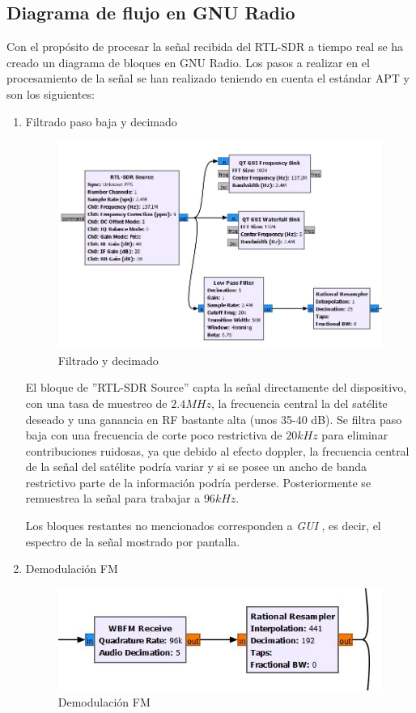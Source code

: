 \documentclass[a4paper,openright,12pt]{article}
\begin{document}
	\subsection{Diagrama de flujo en GNU Radio}
	Con el propósito de procesar la señal recibida del RTL-SDR a tiempo real se ha creado un diagrama de bloques en GNU Radio. Los pasos a realizar en el procesamiento de la señal se han realizado teniendo en cuenta el estándar APT y son los siguientes:
	\begin{enumerate}
	\item Filtrado paso baja y decimado
	
		\begin{figure}[hbtp]
 \centering
 \includegraphics[width = 12cm]{imagenes/primer_paso.JPG}
 \caption{Filtrado y decimado}
 \label{filtardo_decimado}
 \end{figure}
 
 El bloque de ''RTL-SDR Source'' capta la señal directamente del dispositivo, con una tasa de muestreo de $2.4 MHz$, la frecuencia central la del satélite deseado y una ganancia en RF bastante alta (unos 35-40 dB).
 Se filtra paso baja con una frecuencia de corte poco restrictiva de $20 kHz$ para eliminar contribuciones ruidosas, ya que debido al efecto doppler, la frecuencia central de la señal del satélite podría variar y si se posee un ancho de banda restrictivo parte de la información podría perderse. Posteriormente se remuestrea la señal para trabajar a $96 kHz$.

Los bloques restantes no mencionados corresponden a \textit{GUI }, es decir, el espectro de la señal mostrado por pantalla.
 
 
 
	\item Demodulación FM
	
		\begin{figure}[hbtp]
 \centering
 \includegraphics[width = 12cm]{imagenes/wbfm.JPG}
 \caption{Demodulación FM}
 \label{wbfm}
 \end{figure}
 

\end{enumerate}
\end{document}
